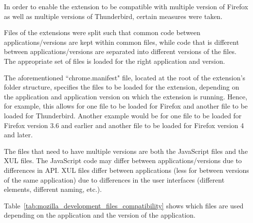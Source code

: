 In order to enable the extension to be compatible with multiple version of Firefox as well as multiple versions of Thunderbird, certain measures were taken. 

Files of the extensions were split such that common code between applications/versions are kept within common files, while code that is different between applications/versions are separated into different versions of the files. The appropriate set of files is loaded for the right application and version. 

The aforementioned ``chrome.manifest" file, located at the root of the extension's folder structure, specifies the files to be loaded for the extension, depending on the application and application version on which the extension is running. Hence, for example, this allows for one file to be loaded for Firefox and another file to be loaded for Thunderbird. Another example would be for one file to be loaded for Firefox version 3.6 and earlier and another file to be loaded for Firefox version 4 and later. 

The files that need to have multiple versions are both the JavaScript files and the XUL files. The JavaScript code may differ between applications/versions due to differences in API. XUL files differ between applications (less for between versions of the same application) due to differences in the user interfaces (different elements, different naming, etc.).

Table~\ref{tab:mozilla_development_files_compatibility} shows which files are used depending on the application and the version of the application. 

